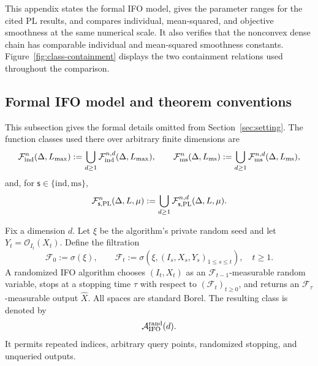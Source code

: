 \documentclass{article}
\theoremstyle{definition}
\begin{document}
This appendix states the formal IFO model, gives the parameter ranges for the
cited PL results, and compares individual, mean-squared, and objective
smoothness at the same numerical scale.  It also verifies that the nonconvex
dense chain has comparable individual and mean-squared smoothness constants.
Figure~\ref{fig:class-containment} displays the two containment relations used
throughout the comparison.

\subsection{Formal IFO model and theorem conventions}
\label{app:formal-ifo-model}

This subsection gives the formal details omitted from
Section~\ref{sec:setting}.  The function classes used there over arbitrary
finite dimensions are
\begin{equation}
 \mathcal F_{\rm ind}^n(\Delta,L_{\max})
 :=\bigcup_{d\ge1}\mathcal F_{\rm ind}^{n,d}(\Delta,L_{\max}),
 \qquad
 \mathcal F_{\rm ms}^n(\Delta,L_{\rm ms})
 :=\bigcup_{d\ge1}\mathcal F_{\rm ms}^{n,d}(\Delta,L_{\rm ms}),
 \label{eq:dimension-free-class}
\end{equation}
and, for $\mathsf s\in\{\mathrm{ind},\mathrm{ms}\}$,
\begin{equation}
 \mathcal F_{\mathsf s,\rm PL}^{n}(\Delta,L,\mu)
 :=\bigcup_{d\ge1}\mathcal F_{\mathsf s,\rm PL}^{n,d}
 (\Delta,L,\mu).
 \label{eq:pl-function-class}
\end{equation}

Fix a dimension $d$.  Let $\xi$ be the algorithm's private random seed and let
$Y_t=\mathcal O_{I_t}(X_t)$.  Define the filtration
\begin{equation}
 \mathcal F_0:=\sigma(\xi),
 \qquad
 \mathcal F_t:=\sigma\!\left(\xi,(I_s,X_s,Y_s)_{1\le s\le t}\right),
 \quad t\ge1.
 \label{eq:ifo-filtration}
\end{equation}
A randomized IFO algorithm chooses $(I_t,X_t)$ as an
$\mathcal F_{t-1}$-measurable random variable, stops at a stopping time $\tau$
with respect to $(\mathcal F_t)_{t\ge0}$, and returns an
$\mathcal F_\tau$-measurable output $\widehat X$.  All spaces are standard Borel.
The resulting class is denoted by
\begin{equation}
 \mathcal A_{\rm IFO}^{\rm rand}(d).
 \label{eq:rand-ifo-class}
\end{equation}
It permits repeated indices, arbitrary query points, randomized stopping, and
unqueried outputs.
\end{document}
